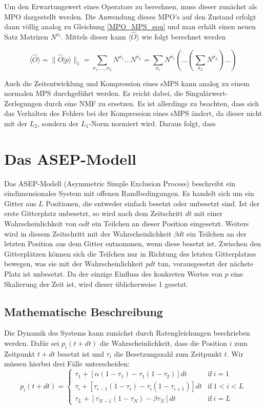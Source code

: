 \documentclass[10pt,a4paper]{report}
\newcommand{\SumIndex}{\sigma_1,\ldots,\sigma_L}
\begin{document}
Um den Erwartungswert eines Operators zu berechnen, muss dieser zunächst als MPO dargestellt werden. Die Anwendung dieses MPO's auf den Zustand erfolgt dann völlig analog zu Gleichung \ref{MPO_MPS_equ} und man erhält einen neuen Satz Matrizen $N^{\sigma_i}$. Mittels dieser kann $\langle\hat{O}\rangle$ wie folgt berechnet werden

\begin{equation}
\langle\hat{O}\rangle=\parallel \hat{O}|p\rangle\parallel_1=\sum_{\SumIndex}N^{\sigma_1}\ldots N^{\sigma_L}=\sum_{\sigma_1}N^{\sigma_1}(\ldots(\sum_{\sigma_L}N^{\sigma_L})\ldots)
\end{equation}

Auch die Zeitentwicklung und Kompression eines sMPS kann analog zu einem normalen MPS durchgeführt werden. Es reicht dabei, die Singulärwert-Zerlegungen durch eine NMF zu ersetzen. Es ist allerdings zu beachten, dass sich das Verhalten des Fehlers bei der Kompression eines sMPS ändert, da dieser nicht mit der $L_2$, sondern der $L_1$-Norm normiert wird. Daraus folgt, dass 


\chapter{Das ASEP-Modell}
Das ASEP-Modell (Asymmetric Simple Exclusion Process) beschreibt ein eindimensionales System mit offenen Randbedingungen. Es handelt sich um ein Gitter aus $L$ Positionen, die entweder einfach besetzt oder unbesetzt sind. Ist der erste Gitterplatz unbesetzt, so wird nach dem Zeitschritt $dt$ mit einer Wahrscheinlichkeit von $\alpha dt$ ein Teilchen an dieser Position eingesetzt. Weiters wird in diesem Zeitschritt mit der Wahrscheinlichkeit $\beta dt$ ein Teilchen an der letzten Position aus dem Gitter entnommen, wenn diese besetzt ist. Zwischen den Gitterplätzen können sich die Teilchen nur in Richtung des letzten Gitterplatzes bewegen, was sie mit der Wahrscheinlichkeit $pdt$ tun, vorausgesetzt der nächste Platz ist unbesetzt. Da der einzige Einfluss des konkreten Wertes von $p$ eine Skalierung der Zeit ist, wird  dieser üblicherweise 1 gesetzt.\\

\section{Mathematische Beschreibung}
Die Dynamik des Systems kann zunächst durch Ratengleichungen beschrieben werden. Dafür sei $p_i(t+dt)$ die Wahrscheinlichkeit, dass die Position $i$ zum Zeitpunkt $t+dt$ besetzt ist und $\tau_i$ die Besetzungszahl zum Zeitpunkt $t$. Wir müssen hierbei drei Fälle unterscheiden:
\begin{equation}\label{rate_equ}
p_i(t+dt)=
\begin{cases}
\tau_1+[\alpha(1-\tau_1)-\tau_1(1-\tau_2)]dt & \text{if}\ i=1\\
\tau_i+[\tau_{i-1}(1-\tau_i)-\tau_i(1-\tau_{i+1})]dt & \text{if}\ 1<i<L\\
\tau_L+[\tau_{N-1}(1-\tau_N)-\beta\tau_N]dt & \text{if}\ i=L
\end{cases}
\end{equation}
\end{document}

